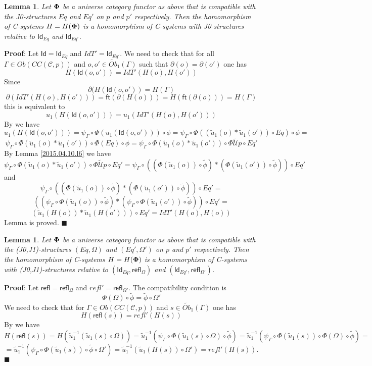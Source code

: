 \documentclass[12pt]{article}
\numberwithin{equation}{section}
\newenvironment{myproof}{{\bf Proof}:}{$\blacksquare$ \vskip 5mm }
\newtheorem{lemma}[proposition]{Lemma}
\newcommand{\llabel}[1]{\label{#1}}
\newcommand{\wt}{\widetilde}
\newcommand{\toCC}{CC} %
\newcommand{\ft}{\mathsf{ft}}
\newcommand{\Id}{\mathsf{Id}} %
\newcommand{\refl}{\mathsf{refl}}
\newcommand{\U}{\mathcal{U}}
\begin{document}
\begin{lemma}
\llabel{2015.04.12.l1} Let ${\bf\Phi}$ be a universe category functor as above
that is compatible with the J0-structures $Eq$ and $Eq'$ on $p$ and $p'$
respectively. Then the homomorphism of C-systems $H=H({\bf\Phi})$ is a
homomorphism of C-systems with J0-structures relative to $\Id_{Eq}$ and
$\Id_{Eq'}$.
\end{lemma}
%
\begin{myproof}
Let $\Id=\Id_{Eq}$ and $IdT'=\Id_{Eq'}$. We need to check that for all
$\Gamma\in Ob(\toCC({\mathcal C},p))$ and $o,o'\in \wt{Ob}_1(\Gamma)$ such that
$\partial(o)=\partial(o')$ one has
%
$$H(\Id(o,o'))=IdT'(H(o),H(o'))$$
%
Since
%
$$\partial(H(\Id(o,o'))=H(\Gamma)$$
%
$$\partial(IdT'(H(o),H(o')))=\ft(\partial(H(o)))=H(\ft(\partial(o)))=H(\Gamma)$$
%
this is equivalent to
%
$$u_1(H(\Id(o,o')))=u_1(IdT'(H(o),H(o')))$$
%
By \cite[Lemma 6.1(1)]{fromunivwithPi} we have
%
$$u_1(H(\Id(o,o')))=\psi_{\Gamma}\circ\Phi(u_1(\Id(o,o')))\circ\phi=\psi_{\Gamma}\circ\Phi((\wt{u}_1(o)*\wt{u}_1(o'))\circ
Eq)\circ\phi=$$
%
$$\psi_{\Gamma}\circ\Phi(\wt{u}_1(o)*\wt{u}_1(o'))\circ
\Phi(Eq)\circ\phi=\psi_{\Gamma}\circ\Phi(\wt{u}_1(o)*\wt{u}_1(o'))\circ
\Phi\wt{\U}p\circ Eq'$$
%
By Lemma \ref{2015.04.10.l6} we have
%
$$\psi_{\Gamma}\circ\Phi(\wt{u}_1(o)*\wt{u}_1(o'))\circ \Phi\wt{\U}p\circ
Eq'=\psi_{\Gamma}\circ((\Phi(\wt{u}_1(o))\circ\wt{\phi})*(\Phi(\wt{u}_1(o'))\circ\wt{\phi}))\circ
Eq'$$
%
and \cite[Lemma 6.1(2)]{fromunivwithPi}
%
$$\psi_{\Gamma}\circ((\Phi(\wt{u}_1(o))\circ\wt{\phi})*(\Phi(\wt{u}_1(o'))\circ\wt{\phi}))\circ
Eq'=$$
$$((\psi_{\Gamma}\circ\Phi(\wt{u}_1(o))\circ\wt{\phi})*(\psi_{\Gamma}\circ\Phi(\wt{u}_1(o'))\circ\wt{\phi}))\circ
Eq'=$$
$$(\wt{u}_1(H(o))*\wt{u}_1(H(o')))\circ Eq'=IdT'(H(o),H(o))$$
%
Lemma is proved.
\end{myproof}
%
\begin{lemma}
\llabel{2015.04.12.l2} Let ${\bf\Phi}$ be a universe category functor as above
that is compatible with the (J0,J1)-structures $(Eq,\Omega)$ and
$(Eq',\Omega')$ on $p$ and $p'$ respectively. Then the homomorphism of
C-systems $H=H({\bf\Phi})$ is a homomorphism of C-systems with
(J0,J1)-structures relative to $(\Id_{Eq},\refl_{\Omega})$ and
$(\Id_{Eq'},\refl_{\Omega'})$.
\end{lemma}
%
\begin{myproof}
Let $\refl=\refl_{\Omega}$ and $refl'=\refl_{\Omega'}$. The compatibility
condition is
%
$$\Phi(\Omega)\circ\wt{\phi}=\wt{\phi}\circ\Omega'$$
%
We need to check that for $\Gamma\in Ob(\toCC({\mathcal C},p))$ and $s\in
\wt{Ob}_1(\Gamma)$ one has
%
$$H(\refl(s))=refl'(H(s))$$
%
By \cite[Lemma 6.1(2)]{fromunivwithPi} we have
%
$$H(\refl(s))=H(\wt{u}_1^{-1}(\wt{u}_1(s)\circ\Omega))=\wt{u}_1^{-1}(\psi_{\Gamma}\circ\Phi(\wt{u}_1(s)\circ\Omega)\circ\wt{\phi})=\wt{u}_1^{-1}(\psi_{\Gamma}\circ\Phi(\wt{u}_1(s))\circ\Phi(\Omega)\circ
\wt{\phi})=$$
$$=\wt{u}_1^{-1}(\psi_{\Gamma}\circ\Phi(\wt{u}_1(s))\circ\wt{\phi}\circ\Omega')=\wt{u}_1^{-1}(\wt{u}_1(H(s))\circ\Omega')=refl'(H(s)).$$
\end{myproof}
%
\end{document}
